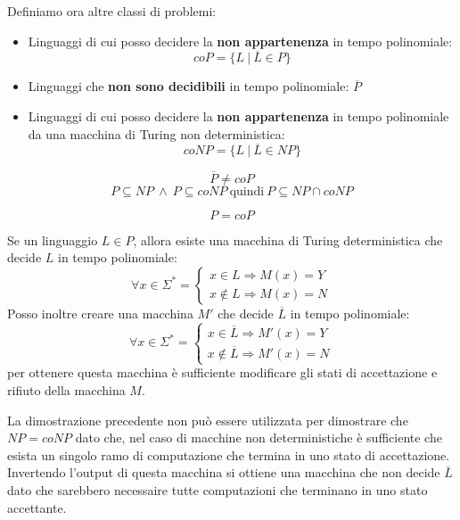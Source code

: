 Definiamo ora altre classi di problemi:
\begin{itemize}
    \item Linguaggi di cui posso decidere la \textbf{non appartenenza} in tempo polinomiale:
          \begin{equation}
              coP = \{L \ | \ \overline{L} \in P\}
          \end{equation}
    \item Linguaggi che \textbf{non sono decidibili} in tempo polinomiale: $\overline{P}$
    \item Linguaggi di cui posso decidere la \textbf{non appartenenza} in tempo
          polinomiale da una macchina di Turing non deterministica:
          \begin{equation}
              coNP = \{L \ | \ \overline{L} \in NP\}
          \end{equation}
\end{itemize}
\begin{nota}
    \begin{equation}
        \overline{P} \neq coP
    \end{equation}
    \begin{equation}
        P \subseteq NP \ \land \ P \subseteq coNP \ \text{quindi} \ P \subseteq NP \cap coNP
    \end{equation}
\end{nota}
\begin{teorema}
    \begin{equation}
        P = coP
    \end{equation}
\end{teorema}
\begin{dimostrazione}
    Se un linguaggio $L \in P$, allora esiste una macchina di Turing deterministica
    che decide $L$ in tempo polinomiale:
    \begin{equation}
        \forall x \in \Sigma^{\ast} = \begin{cases}
            x \in L \Rightarrow M(x) = Y \\
            x \not\in L \Rightarrow M(x) = N
        \end{cases}
    \end{equation}
    Posso inoltre creare una macchina $M'$ che decide $\overline{L}$ in tempo polinomiale:
    \begin{equation}
        \forall x \in \Sigma^{\ast} = \begin{cases}
            x \in \overline{L} \Rightarrow M'(x) = Y \\
            x \not\in \overline{L} \Rightarrow M'(x) = N
        \end{cases}
    \end{equation}
    per ottenere questa macchina è sufficiente modificare gli stati di accettazione
    e rifiuto della macchina $M$.
\end{dimostrazione}
La dimostrazione precedente non può essere utilizzata per dimostrare che $NP = coNP$
dato che, nel caso di macchine non deterministiche è sufficiente che esista un singolo
ramo di computazione che termina in uno stato di accettazione. Invertendo l'output di questa
macchina si ottiene una macchina che non decide $\bar{L}$ dato che sarebbero necessaire
tutte computazioni che terminano in uno stato accettante.
